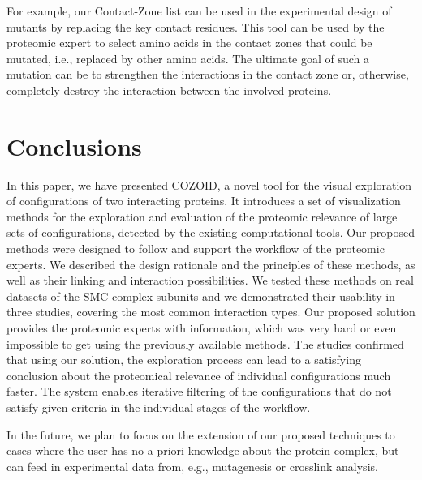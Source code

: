 \documentclass{bmcart}
\def\CoZoList{Contact-Zone list\xspace}
\begin{document}
For example, our \CoZoList can be used in the experimental design of mutants by replacing the key contact residues. 
This tool can be used by the proteomic expert to select amino acids in the contact zones that could be mutated, i.e., replaced by other amino acids.
The ultimate goal of such a mutation can be to strengthen the interactions in the contact zone or, otherwise, completely destroy the interaction between the involved proteins. 


\section*{Conclusions}
In this paper, we have presented COZOID, a novel tool for the visual exploration of configurations of two interacting proteins. 
It introduces a set of visualization methods for the exploration and evaluation of the proteomic relevance of large sets of configurations, detected by the existing computational tools.
Our proposed methods were designed to follow and support the workflow of the proteomic experts.
We described the design rationale and the principles of these methods, as well as their linking and interaction possibilities. 
We tested these methods on real datasets of the SMC complex subunits and we demonstrated their usability in three studies, covering the most common interaction types.
Our proposed solution provides the proteomic experts with information, which was very hard or even impossible to get using the previously available methods.
The studies confirmed that using our solution, the exploration process can lead to a satisfying conclusion about the proteomical relevance of individual configurations much faster.
The system enables iterative filtering of the configurations that do not satisfy given criteria in the individual stages of the workflow.

In the future, we plan to focus on the extension of our proposed techniques to cases where the user has no a priori knowledge about the protein complex, but can feed in experimental data from, e.g., mutagenesis or crosslink analysis.
\end{document}
